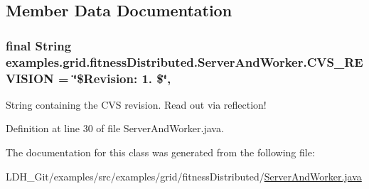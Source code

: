 \subsection{Member Data Documentation}
\hypertarget{classexamples_1_1grid_1_1fitness_distributed_1_1_server_and_worker_a6499f85f982863449037552f2eb3b1a5}{
\subsubsection[{C\-V\-S\-\_\-\-R\-E\-V\-I\-S\-I\-O\-N}]{\setlength{\rightskip}{0pt plus 5cm}final String examples.\-grid.\-fitness\-Distributed.\-Server\-And\-Worker.\-C\-V\-S\-\_\-\-R\-E\-V\-I\-S\-I\-O\-N = \char`\"{}\$Revision\-: 1. \$\char`\"{}\hspace{0.3cm}{\ttfamily [static]}, {\ttfamily [private]}}}\label{classexamples_1_1grid_1_1fitness_distributed_1_1_server_and_worker_a6499f85f982863449037552f2eb3b1a5}
String containing the C\-V\-S revision. Read out via reflection! 

Definition at line 30 of file Server\-And\-Worker.\-java.



The documentation for this class was generated from the following file\-:\begin{DoxyCompactItemize}
\item 
L\-D\-H\-\_\-\-Git/examples/src/examples/grid/fitness\-Distributed/\hyperlink{fitness_distributed_2_server_and_worker_8java}{Server\-And\-Worker.\-java}\end{DoxyCompactItemize}
